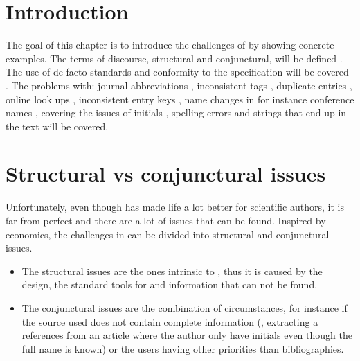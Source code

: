 
\section{Introduction}
The goal of this chapter is to introduce the challenges of {\bibtex}
by showing concrete examples.  The terms of discourse, structural and
conjunctural, will be defined
.  The use of de-facto
standards and conformity to the {\bibtex} specification will be
covered .  The problems with: journal
abbreviations , inconsistent tags
, duplicate entries
, online look ups
, inconsistent entry keys
, name changes in for instance
conference names , covering the
issues of initials , spelling errors
 and {\bibtex} strings that end up in
the text  will be covered.

\section{Structural vs conjunctural issues}
\label{sec:problems_structural_conjunctural}

Unfortunately, even though {\bibtex} has made life a lot better for
scientific authors, it is far from perfect and there are a lot of
issues that can be found.  Inspired by economics, the challenges in
{\bibtex} can be divided into structural and conjunctural issues. 

\begin{itemize}
\item The structural issues are the ones intrinsic to {\bibtex}, thus
  it is caused by the design, the standard tools for {\bibtex} and
  information that can not be found.

\item The conjunctural issues are the combination of circumstances,
  for instance if the source used does not contain complete
  information (\eg, extracting a references from an article where the
  author only have initials even though the full name is known) or the
  users having other priorities than bibliographies.
\end{itemize}

